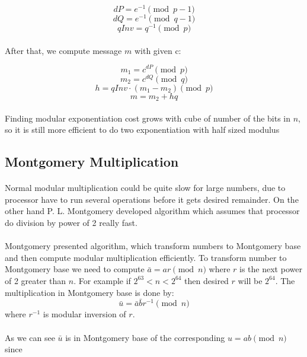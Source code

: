 \documentclass[thesis=B,english]{FITthesis}[2012/10/20]
\begin{document}
\[dP = e^{-1} \pmod{p-1}\]
\[dQ = e^{-1} \pmod{q-1}\]
\[qInv = q^{-1} \pmod{p}\]

\paragraph*{}
{After that, we compute message \(m\) with given c:}

\[m_1 = c^{dP} \pmod{p}\]
\[m_2 = c^{dQ} \pmod{q}\]
\[h = qInv \cdot (m_1 - m_2) \pmod{p}\]  
\[m = m_2 + hq\]

\paragraph*{}
{Finding modular exponentiation cost grows with cube of number of the bits in \(n\), so it is still more efficient to do two exponentiation with half sized modulus}



\subsection{Montgomery Multiplication}

\paragraph*{}
{Normal modular multiplication could be quite slow for large numbers, due to processor have to run several operations before it gets desired remainder. On the other hand P. L. Montgomery developed algorithm which assumes that processor do division by power of 2 really fast.}
\paragraph*{}{
Montgomery presented algorithm, which transform numbers to Montgomery base and then compute modular multiplication efficiently. To transform number to Montgomery base we need to compute \(\bar{a} = ar \pmod{n}\) where \(r\) is the next  power of 2 greater than \(n\). For example if \(2^{63} < n < 2^{64}\) then desired \(r\) will be \(2^{64}\). The multiplication in Montgomery base is done by: \[\bar{u} = \bar{a}\bar{b}r^{-1} \pmod{n}\] where \(r^{-1}\) is modular inversion of \(r\).
}
\paragraph*{}{
As we can see \(\bar{u}\) is in Montgomery base of the corresponding 
\(u = ab \pmod{n}\) 
since}
\end{document}
